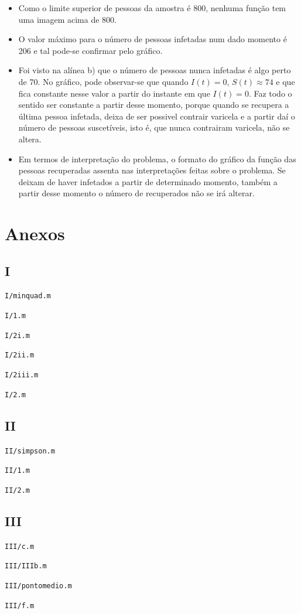 \documentclass[portuguese, a4paper]{article}
\newcommand\tu[0]{\textunderscore}
\begin{document}
		\begin{itemize}
		\item Como o limite superior de pessoas da amostra é 800, nenhuma função tem uma imagem acima de 800.
		\item O valor máximo para o número de pessoas infetadas num dado momento é 206 e tal pode-se confirmar pelo gráfico.
		\item Foi visto na alínea b) que o número de pessoas
		nunca infetadas é algo perto de 70. %
		No gráfico, pode observar-se que quando $I(t) = 0$, $S(t) \approx 74$ e que fica constante nesse valor a partir do instante em que $I(t) = 0$.
		Faz todo o sentido ser constante a partir desse momento, porque quando
		se recupera a última pessoa infetada, deixa de ser possivel contrair
		varicela e a partir daí o número de pessoas suscetíveis, isto é, que
		nunca contrairam varicela, não se altera.
		\item Em termos de interpretação do problema, o formato do gráfico da função das pessoas recuperadas assenta nas interpretações
		feitas sobre o problema. Se deixam de haver infetados a partir de determinado momento,
		também a partir desse momento o número de recuperados não se irá
		alterar.
		\end{itemize}

\newpage
\section{Anexos}
\subsection{I}
	\texttt{I/min\tu quad.m}
	

	\texttt{I/1.m}
	

	\texttt{I/2\tu i.m}
	

	\texttt{I/2\tu ii.m}
	

	\texttt{I/2\tu iii.m}
	

	\texttt{I/2.m}
	

\newpage
\subsection{II}
	\texttt{II/simpson.m}
	

	\texttt{II/1.m}
	

	\texttt{II/2.m}
	

\newpage
\subsection{III}
	\texttt{III/c.m}
	

	\texttt{III/III\tu b.m}
	

	\texttt{III/ponto\tu medio.m}
	

	\texttt{III/f.m}
	
\end{document}
